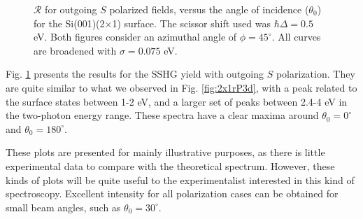 \begin{figure}[H]
\centering
{}\hfill
{}
\caption{$\mathcal{R}$ for outgoing $S$ polarized fields, versus the angle of
    incidence ($\theta_{0}$) for the Si(001)(2$\times$1) surface. The scissor
    shift used was $\hbar\Delta = 0.5$ eV. Both figures consider an azimuthal
    angle of $\phi = 45^{\circ}$. All curves are broadened with $\sigma = 0.075$
    eV.}
\label{fig:2x1rS3d}
\end{figure}

Fig. \ref{fig:2x1rS3d} presents the results for the SSHG yield with outgoing $S$
polarization. They are quite similar to what we observed in Fig.
\ref{fig:2x1rP3d}, with a peak related to the surface states between 1-2 eV, and
a larger set of peaks between 2.4-4 eV in the two-photon energy range. These
spectra have a clear maxima around $\theta_{0} = 0^{\circ}$ and $\theta_{0} =
180^{\circ}$.

These plots are presented for mainly illustrative purposes, as there is little
experimental data to compare with the theoretical spectrum. However, these kinds
of plots will be quite useful to the experimentalist interested in this kind of
spectroscopy. Excellent intensity for all polarization cases can be obtained for
small beam angles, such as $\theta_{0} = 30^{\circ}$.


